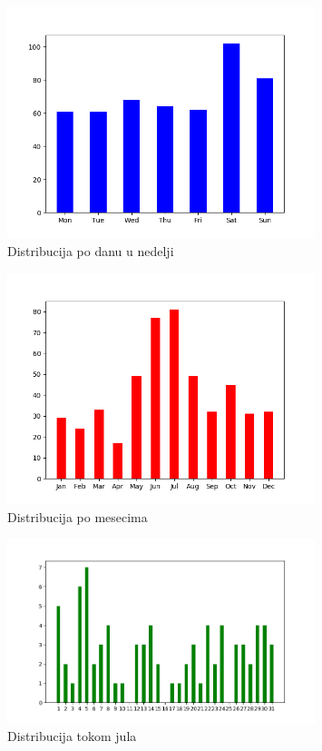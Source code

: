 \documentclass[11pt]{article} %
\begin{document}
\begin{figure}[h!]
	\centering
	\includegraphics[width=0.8\textwidth]{incidents_per_dayofweek}
	\caption{Distribucija po danu u nedelji}
\end{figure}
\begin{figure}[h!]
	\centering
	\includegraphics[width=0.8\textwidth]{incidents_permonth}
	\caption{Distribucija po mesecima}
\end{figure}
\begin{figure}[h!]
	\centering
	\includegraphics[width=0.8\textwidth]{incidents_july}
	\caption{Distribucija tokom jula}
\end{figure}
\end{document}

